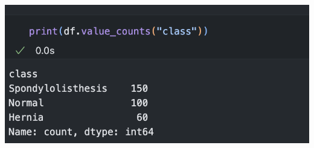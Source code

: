 \documentclass[12pt]{article}
\begin{document}
\begin{enumerate}[leftmargin=\labelsep]
    \begin{center}
        \includegraphics[scale=0.6]{images/code8.png}
    \end{center}
\end{enumerate}
\end{document}
